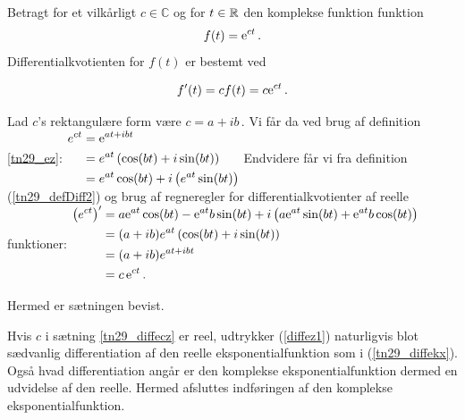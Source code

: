 \begin{theorem}[Differentiation af $\e^{ct}$]\label{tn29_diffecz}
Betragt for et vilkårligt $c\in\mathbb C$ og for $t\in\mathbb{R}$ den komplekse funktion funktion 
\begin{equation}
f(t)=\mathrm{e}^{ct}\,.
\end{equation}
Differentialkvotienten for $f(t)$ er bestemt ved

\begin{equation}\label{diffez1}
f'(t)=cf(t)=c\mathrm{e}^{ct}\,.
\end{equation}
\end{theorem}
\begin{bevis}
Lad $c$'s rektangulære form være $c=a+ib\,.$ Vi får da ved brug af definition \ref{tn29_ez}:\bs
$
\begin{aligned}
e^{ct}&=\mathrm{e}^{at+ibt}\\
&=e^{at}\left(\cos(bt)+i\sin(bt)\right)\\
&=e^{at}\cos(bt)+i\left(e^{at}\sin(bt)\right)
\end{aligned}
$\bs
Endvidere får vi fra definition (\ref{tn29_defDiff2}) og brug af regneregler for differentialkvotienter af reelle funktioner:\bs
$
\begin{aligned}
\left(e^{ct}\right)'&=
a\mathrm{e}^{at}\cos(bt)-\mathrm{e}^{at}b\sin(bt)+i\left(a\mathrm{e}^{at}\sin(bt)+\mathrm{e}^{at}b\cos(bt)\right)\\
&=(a+ib)e^{at}\left(\cos(bt)+i\sin(bt)\right)\\
&=(a+ib)e^{at+ibt}\\
&=c\,\mathrm{e}^{ct}\,.
\end{aligned}
$\bs

Hermed er sætningen bevist.
\end{bevis}

Hvis $c$ i sætning \ref{tn29_diffecz} er reel, udtrykker (\ref{diffez1}) naturligvis blot sædvanlig differentiation af den reelle eksponentialfunktion som i (\ref{tn29_diffekx}). Også hvad differentiation angår er den komplekse eksponentialfunktion dermed en udvidelse af den reelle. \bs
Hermed afsluttes indføringen af den komplekse eksponentialfunktion.

 